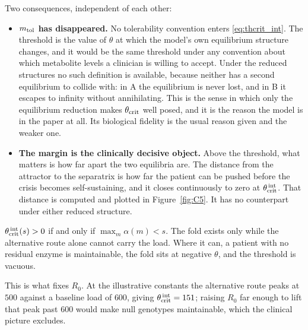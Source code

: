 Two consequences, independent of each other:

\begin{itemize}[leftmargin=*, itemsep=3pt]
\item \label{item:wellposed}\textbf{$m_{\mathrm{tol}}$ has disappeared.} No tolerability convention enters
\eqref{eq:thcrit_int}. The threshold is the value of $\theta$ at which the model's own
equilibrium structure changes, and it would be the same threshold under any convention
about which metabolite levels a clinician is willing to accept. Under the reduced structures no such
definition is available, because neither has a second equilibrium to collide with: in A the
equilibrium is never lost, and in B it escapes to infinity without annihilating. This is
the sense in which only the equilibrium reduction makes $\theta_{\mathrm{crit}}$ well posed, and
it is the reason the model is in the paper at all. Its biological fidelity is the usual
reason given and the weaker one.
\item \textbf{The margin is the clinically decisive object.} Above the threshold, what
matters is how far apart the two equilibria are. The
distance from the attractor to the separatrix is how far the patient can be pushed before
the crisis becomes self-sustaining, and it closes continuously to zero at
$\theta_{\mathrm{crit}}^{\,\mathrm{int}}$. That distance is computed and plotted in
Figure~\ref{fig:C5}. It has no counterpart under either reduced structure.
\end{itemize}

\begin{corollary}
\label{cor:fold}
$\theta_{\mathrm{crit}}^{\,\mathrm{int}}(s) > 0$ if and only if $\max_m \alpha(m) < s$. The fold exists only
while the alternative route alone cannot carry the load. Where it can, a patient with no
residual enzyme is maintainable, the fold sits at negative $\theta$, and the threshold is
vacuous.
\end{corollary}

This is what fixes $R_0$. At the illustrative constants the alternative route peaks at $500$
against a baseline load of $600$, giving $\theta_{\mathrm{crit}}^{\,\mathrm{int}} = 151$; raising $R_0$ far
enough to lift that peak past $600$ would make null genotypes maintainable, which the
clinical picture excludes.

